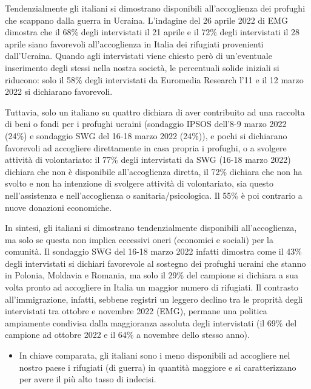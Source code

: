 \documentclass[
  openany]{book}
\providecommand{\tightlist}{%
  \setlength{\itemsep}{0pt}\setlength{\parskip}{0pt}}
\begin{document}
Tendenzialmente gli italiani si dimostrano disponibili all'accoglienza dei profughi che scappano dalla guerra in Ucraina. L'indagine del 26 aprile 2022 di EMG dimostra che il 68\% degli intervistati il 21 aprile e il 72\% degli intervistati il 28 aprile siano favorevoli all'accoglienza in Italia dei rifugiati provenienti dall'Ucraina. Quando agli intervistati viene chiesto però di un'eventuale inserimento degli stessi nella nostra società, le percentuali solide iniziali si riducono: solo il 58\% degli intervistati da Euromedia Research l'11 e il 12 marzo 2022 si dichiarano favorevoli.

Tuttavia, solo un italiano su quattro dichiara di aver contribuito ad una raccolta di beni o fondi per i profughi ucraini (sondaggio IPSOS dell'8-9 marzo 2022 (24\%) e sondaggio SWG del 16-18 marzo 2022 (24\%)), e pochi si dichiarano favorevoli ad accogliere direttamente in casa propria i profughi, o a svolgere attività di volontariato: il 77\% degli intervistati da SWG (16-18 marzo 2022) dichiara che non è disponibile all'accoglienza diretta, il 72\% dichiara che non ha svolto e non ha intenzione di svolgere attività di volontariato, sia questo nell'assistenza e nell'accoglienza o sanitaria/psicologica. Il 55\% è poi contrario a nuove donazioni economiche.

In sintesi, gli italiani si dimostrano tendenzialmente disponibili all'accoglienza, ma solo se questa non implica eccessivi oneri (economici e sociali) per la comunità. Il sondaggio SWG del 16-18 marzo 2022 infatti dimostra come il 43\% degli intervistati si dichiari favorevole al sostegno dei profughi ucraini che stanno in Polonia, Moldavia e Romania, ma solo il 29\% del campione si dichiara a sua volta pronto ad accogliere in Italia un maggior numero di rifugiati. Il contrasto all'immigrazione, infatti, sebbene registri un leggero declino tra le proprità degli intervistati tra ottobre e novembre 2022 (EMG), permane una politica ampiamente condivisa dalla maggioranza assoluta degli intervistati (il 69\% del campione ad ottobre 2022 e il 64\% a novembre dello stesso anno).

\begin{itemize}
\tightlist
\item
  In chiave comparata, gli italiani sono i meno disponibili ad accogliere nel nostro paese i rifugiati (di guerra) in quantità maggiore e si caratterizzano per avere il più alto tasso di indecisi.
\end{itemize}
\end{document}
